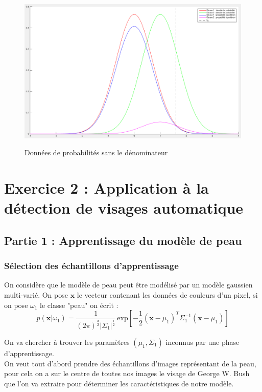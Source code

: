 \documentclass[11pt,a4paper]{article}
\begin{document}
\begin{figure}[H]
\center
\includegraphics[width=15cm]{exo1_graph_numerateur.png}
\label{fig.exo1_graph_numerateur}
\caption{Données de probabilités sans le dénominateur}
\end{figure}

\section{Exercice 2 : Application à la détection de visages automatique}


\subsection{Partie 1 : Apprentissage du modèle de peau}

\subsubsection{Sélection des échantillons d'apprentissage}

On considère que le modèle de peau peut être modélisé par un modèle gaussien multi-varié. On pose $\textbf{x}$ le vecteur contenant les données de couleurs d'un pixel, si on pose $\omega_1$ le classe "peau" on écrit :
\begin{equation}
p(\textbf{x}|\omega_1) = \frac{1}{(2\pi)^{\frac{d}{2}}|\Sigma_1|^{\frac{1}{2}}}\,\text{exp}\left[-\frac{1}{2}(\textbf{x}-\mu_1)^T \Sigma_1^{-1}(\textbf{x}-\mu_1)\right]
\label{eq.gauss.multi}
\end{equation}

On va chercher à trouver les paramètres $\left(\mu_1,\Sigma_1\right)$ inconnus par une phase d'apprentissage.
\\
On veut tout d'abord prendre des échantillons d'images représentant de la peau, pour cela on a sur le centre de toutes nos images le visage de George W. Bush que l'on va extraire pour déterminer les caractéristiques de notre modèle.
\end{document}
